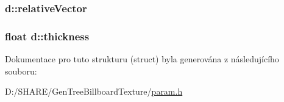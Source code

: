 \label{structd_a9889457e0e1cd5c70ffd516d1f6d7e9e}
\hypertarget{structd_ab1a0dbc8c315801b9b7a85a2f3b9bcd7}{
\subsubsection[{relativeVector}]{ {\bf d::relativeVector}}}
\label{structd_ab1a0dbc8c315801b9b7a85a2f3b9bcd7}
\hypertarget{structd_a9b633f3ab87eb2b89a2d48082b8aa2ce}{
\subsubsection[{thickness}]{\setlength{\rightskip}{0pt plus 5cm}float {\bf d::thickness}}}
\label{structd_a9b633f3ab87eb2b89a2d48082b8aa2ce}


Dokumentace pro tuto strukturu (struct) byla generována z následujícího souboru:\begin{DoxyCompactItemize}
\item 
D:/SHARE/GenTreeBillboardTexture/\hyperlink{param_8h}{param.h}\end{DoxyCompactItemize}
